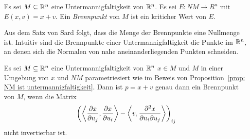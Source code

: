\begin{definition}[Brennpunkt]
    \label{def: brennpunkt}
    Es sei $M \subseteq { \mathbb R }^n$ eine Untermannigfaltigkeit von ${ \mathbb R }^n$. Es sei $E \colon NM \to R^n$ 
    mit $E (x, v) = x + v$. Ein \textit{Brennpunkt} von $M$ ist ein kriticher Wert von $E$.
\end{definition}

\begin{remark}
    Aus dem Satz von Sard folgt, dass die Menge der Brennpunkte eine Nullmenge ist.
    Intuitiv sind die Brennpunkte einer Untermannigfaltigkeit die Punkte im ${ \mathbb R }^n$, an denen sich
    die Normalen von nahe aneinanderliegenden Punkten schneiden.
\end{remark}

\begin{lemma}
    \label{lemma: char. von Brennpunkten}
    Es sei $M \subseteq { \mathbb R }^n$ eine Untermannigfaltigkeit von ${ \mathbb R }^n$ $x \in M$ und $M$ in einer 
    Umgebung von $x$ und $NM$ parametriesiert wie im Beweis von 
    Proposition~\ref{prop: NM ist untermannigfaltigkeit}. Dann ist $p = x + v$ genau dann ein
    Brennpunkt von $M$, wenn die Matrix 
    \[
        \left( \left\langle \pderive[x]{u_j}, \pderive[x]{u_i} \right\rangle - 
        \left\langle v , \pdderive[x]{u_i}{u_j} \right\rangle \right)_{ij}
    \]
    nicht invertierbar ist.
\end{lemma}

